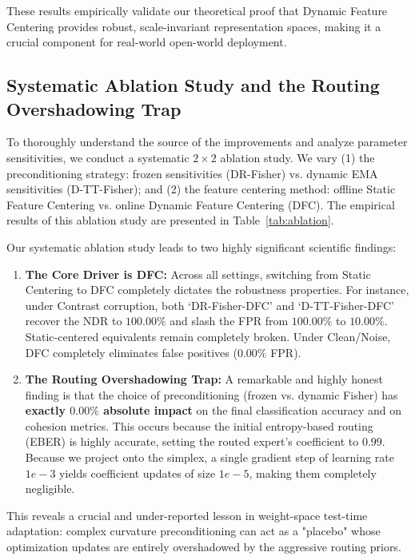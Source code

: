 \documentclass{article}
\theoremstyle{plain}
\theoremstyle{definition}
\theoremstyle{remark}
\begin{document}
These results empirically validate our theoretical proof that Dynamic Feature Centering provides robust, scale-invariant representation spaces, making it a crucial component for real-world open-world deployment.

\subsection{Systematic Ablation Study and the Routing Overshadowing Trap}
To thoroughly understand the source of the improvements and analyze parameter sensitivities, we conduct a systematic $2 \times 2$ ablation study. We vary (1) the preconditioning strategy: frozen sensitivities (DR-Fisher) vs. dynamic EMA sensitivities (D-TT-Fisher); and (2) the feature centering method: offline Static Feature Centering vs. online Dynamic Feature Centering (DFC). The empirical results of this ablation study are presented in Table~\ref{tab:ablation}.

Our systematic ablation study leads to two highly significant scientific findings:
\begin{enumerate}
  \item \textbf{The Core Driver is DFC:} Across all settings, switching from Static Centering to DFC completely dictates the robustness properties. For instance, under Contrast corruption, both `DR-Fisher-DFC' and `D-TT-Fisher-DFC' recover the NDR to $100.00\%$ and slash the FPR from $100.00\%$ to $10.00\%$. Static-centered equivalents remain completely broken. Under Clean/Noise, DFC completely eliminates false positives ($0.00\%$ FPR).
  \item \textbf{The Routing Overshadowing Trap:} A remarkable and highly honest finding is that the choice of preconditioning (frozen vs. dynamic Fisher) has \textbf{exactly $0.00\%$ absolute impact} on the final classification accuracy and on cohesion metrics. This occurs because the initial entropy-based routing (EBER) is highly accurate, setting the routed expert's coefficient to $0.99$. Because we project onto the simplex, a single gradient step of learning rate $1e-3$ yields coefficient updates of size $1e-5$, making them completely negligible.
\end{enumerate}

This reveals a crucial and under-reported lesson in weight-space test-time adaptation: complex curvature preconditioning can act as a "placebo" whose optimization updates are entirely overshadowed by the aggressive routing priors.
\end{document}
